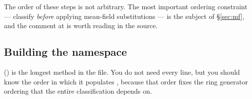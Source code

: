 The order of these steps is not arbitrary. The most important ordering constraint
--- classify \emph{before} applying mean-field substitutions --- is the subject of
\S\ref{sec:mf}, and the comment at  is worth
reading in the source.

\subsection{Building the namespace}\label{sec:buildns}

 () is the longest
method in the file. You do not need every line, but you should know the order in
which it populates , because that order fixes the ring generator ordering
that the entire classification depends on.

